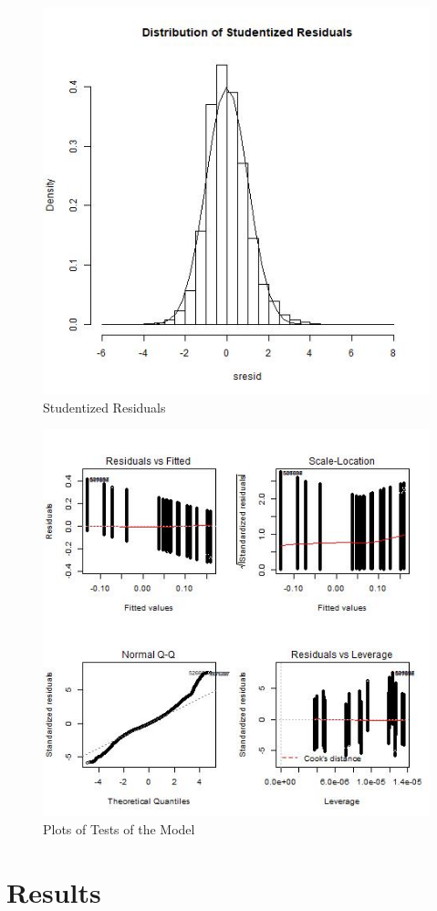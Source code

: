 \documentclass{article}
\begin{document}
\begin{figure}[H]
    \centering
    \includegraphics[width= .6\linewidth]{images/student_resid_plot.jpeg}
    \caption{Studentized Residuals}
    \label{fig: student_resid}
\end{figure}

\begin{figure}[H]
    \centering
    \includegraphics[width= .8\linewidth]{images/plot_matrix.jpeg}
    \caption{Plots of Tests of the Model}
    \label{fig: plot_matrix}
\end{figure}



\section{Results}
\end{document}
